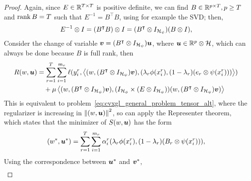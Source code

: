 \begin{proof}
Again, since ${E} \in \mathbb{R}^{T \times T}$ is positive definite, we can find $B \in \mathbb{R}^{p \times T}, p \geq T$ and $\operatorname{rank}{B} = T$ such that $E^{-1} = 
{B^\intercal} {B}$, using for example the SVD;
% 
then,  
$$ E^{-1} \otimes I = (B^\intercal B) \otimes I = (B^\intercal \otimes I_{\mathcal{H}_\psi}) (B \otimes I),$$
%
Consider the change of variable $\bm{v} = (B^\intercal \otimes I_{\mathcal{H}_\psi}) \bm{u}$, where $\bm{u} \in \mathbb{R}^p \otimes \mathcal{H}$, which can always be done because 
$B$ is full rank, then
\begin{equation}
    \nonumber
    \begin{aligned}
        R(w, \bm{u}) &= \sum_{r=1}^{T} \sum_{i=1}^{m_r} \ell(y_i^r, \left\langle (w, (B^\intercal \otimes I_{\mathcal{H}_\psi}) \bm{v}),  (\lambda_r \phi(x_i^r), (1 - \lambda_r) (e_r \otimes \psi(x_i^r))) \right\rangle) \\
        &\quad + \mu \left\langle (w, (B^\intercal \otimes I_{\mathcal{H}_\psi})\bm{v}), (I_{\mathcal{H}_\phi} \times (E \otimes I_{\mathcal{H}_\psi})) (w, (B^\intercal \otimes I_{\mathcal{H}_\psi}) \bm{v})  \right\rangle \\
    \end{aligned}
\end{equation}
This is equivalent to problem~\eqref{eq:cvxgl_general_problem_tensor_alt}, where the regularizer is increasing in $\left\lVert(w, \bm{u})\right\rVert^2$, so can apply the Representer theorem, which states that the minimizer of $S(w, \bm{u})$ has the form
\begin{equation}
    \label{eq:repr_th_convexgl}
    (w^*, \fv{u}^*) = \sum_{r=1}^\ntasks \sum_{i=1}^{\npertask_r} \alpha_i^r (\lambda_r \phi(x_i^r), (1-\lambda_r) (B_r \otimes \psi(x_i^r))) ,
\end{equation}
Using the correspondence between $\bm{u}^*$ and $\bm{v}^*$, 
\begin{equation}\nonumber
    \begin{aligned}

\end{aligned}
\end{equation}
\end{proof}
